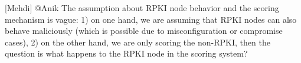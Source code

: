 \textcolor{OliveGreen}{[Mehdi] @Anik The assumption about RPKI node behavior and the scoring mechanism is vague: 1) on one hand, we are assuming that RPKI nodes can also behave maliciously (which is possible due to misconfiguration or compromise cases), 2) on the other hand, we are only scoring the non-RPKI, then the question is what happens to the RPKI node in the scoring system?}







